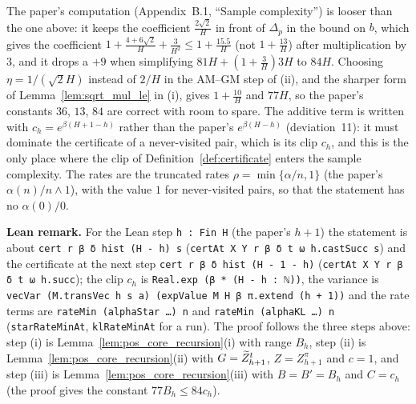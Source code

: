 \begin{remark}\label{rem:pos_constants_recursion}
The paper's computation (Appendix~B.1, ``Sample complexity'') is looser than the one above: it
keeps the coefficient $\frac{2\sqrt2}{H}$ in front of $\Delta_p$ in the bound on $b$, which gives the
coefficient $1 + \frac{4 + 6\sqrt2}{H} + \frac{3}{H^2} \le 1 + \frac{15.5}{H}$ (not $1 + \frac{13}{H}$) after
multiplication by $3$, and it drops a $+9$ when simplifying $81H + (1 + \frac3H)3H$ to $84H$.
Choosing $\eta = 1/(\sqrt2 H)$ instead of $2/H$ in the AM--GM step of (ii), and the sharper
form of Lemma~\ref{lem:sqrt_mul_le} in (i), gives $1 + \frac{10}{H}$ and $77H$, so the paper's
constants $36$, $13$, $84$ are correct with room to spare. The additive term is written with
$c_h = e^{\beta(H+1-h)}$ rather than the paper's $e^{\beta(H-h)}$ (deviation~11): it must dominate
the certificate of a never-visited pair, which is its clip $c_h$, and this is the only place
where the clip of Definition~\ref{def:certificate} enters the sample complexity. The rates are
the truncated rates $\rho = \min\{\alpha/n, 1\}$ (the paper's $\alpha(n)/n \wedge 1$), with the value
$1$ for never-visited pairs, so that the statement has no $\alpha(0)/0$.
\end{remark}

\textbf{Lean remark.} For the Lean step \texttt{h : Fin H} (the paper's $h + 1$) the statement is
about \texttt{cert r β δ hist (H - h) s} (\texttt{certAt X Y r β δ t ω h.castSucc s}) and the certificate
at the next step \texttt{cert r β δ hist (H - 1 - h)} (\texttt{certAt X Y r β δ t ω h.succ}); the clip
$c_h$ is \texttt{Real.exp (β * (H - h : ℕ))}, the variance is
\texttt{vecVar (M.transVec h s a) (expValue M H β π.extend (h + 1))} and the rate terms are
\texttt{rateMin (alphaStar …) n} and \texttt{rateMin (alphaKL …) n} (\texttt{starRateMinAt},
\texttt{klRateMinAt} for a run). The proof follows the three steps above: step (i) is
Lemma~\ref{lem:pos_core_recursion}(i) with range $B_h$, step (ii) is Lemma~\ref{lem:pos_core_recursion}(ii)
with $G = \widetilde{Z}^t_{h+1}$, $Z = Z^\pi_{h+1}$ and $c = 1$, and step (iii) is Lemma~\ref{lem:pos_core_recursion}(iii)
with $B = B' = B_h$ and $C = c_h$ (the proof gives the constant $77 B_h \le 84 c_h$).

